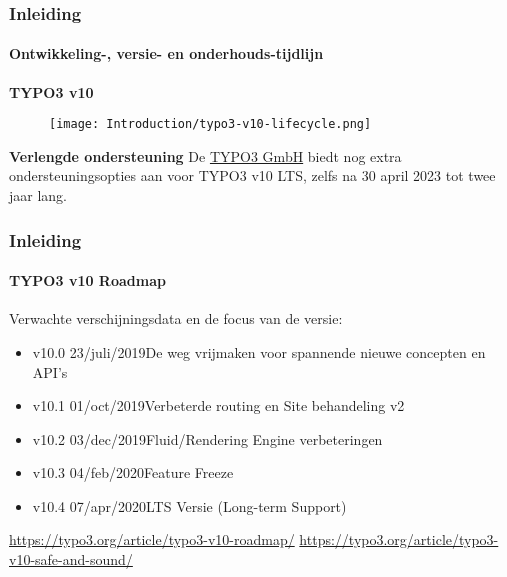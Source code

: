 
\begin{frame}[fragile]
	\frametitle{Inleiding}
	\framesubtitle{Ontwikkeling-, versie- en onderhouds-tijdlijn}

	\textbf{TYPO3 v10}

	\begin{figure}
		\texttt{[image: Introduction/typo3-v10-lifecycle.png]}
	\end{figure}

	\textbf{Verlengde ondersteuning}\newline
	\smaller
	De \href{https://typo3.com}{TYPO3 GmbH} biedt nog extra ondersteuningsopties aan
		voor TYPO3 v10 LTS, zelfs na 30 april 2023 tot twee jaar lang.
	\normalsize

\end{frame}


\begin{frame}[fragile]
	\frametitle{Inleiding}
	\framesubtitle{TYPO3 v10 Roadmap}

	Verwachte verschijningsdata en de focus van de versie:

	\begin{itemize}

		\item
			\begingroup
				\color{typo3orange}
				v10.0 \tabto{1.1cm}23/juli/2019\tabto{3.4cm}De weg vrijmaken voor spannende nieuwe concepten en API's
			\endgroup
		\item v10.1 \tabto{1.1cm}01/oct/2019\tabto{3.4cm}Verbeterde routing en Site behandeling v2
		\item v10.2 \tabto{1.1cm}03/dec/2019\tabto{3.4cm}Fluid/Rendering Engine verbeteringen
		\item v10.3 \tabto{1.1cm}04/feb/2020\tabto{3.4cm}Feature Freeze
		\item v10.4 \tabto{1.1cm}07/apr/2020\tabto{3.4cm}LTS Versie (Long-term Support)

	\end{itemize}

	\smaller
		\url{https://typo3.org/article/typo3-v10-roadmap/}\newline
		\url{https://typo3.org/article/typo3-v10-safe-and-sound/}
	\normalsize

\end{frame}

